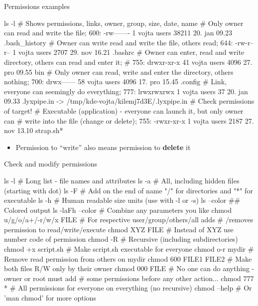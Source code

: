 \documentclass[compress, ucs, xelatex, 11pt, xcolor=svgnames, aspectratio=169,
	hyperref={
		bookmarks=true,
		unicode=true,
		colorlinks=true,
		pdftitle={Linux, command line and MetaCentrum},
		plainpages=false,
		pdfauthor={Vojtech Zeisek},
		pdfsubject={Course about use of Linux command line, writing shell scripts and using MetaCentrum of CESNET},
		pdfcreator={XeLaTeX},
		pdfkeywords={Linux, GNU, BASH, shell, command line, MetaCentrum},
		linkcolor=DarkRed, %
		anchorcolor=DarkBlue, %
		citecolor=Indigo, %
		filecolor=NavyBlue, %
		menucolor=DarkMagenta, %
		urlcolor=DarkBlue, %
		pdftex},
	url={hyphens, lowtilde} %
	]{beamer}
\begin{document}
\begin{frame}[fragile]{Permissions examples}
	\begin{bashcode}
    ls -l # Shows permissions, links, owner, group, size, date, name
    # Only owner can read and write the file; 600:
    -rw-------   1 vojta users   38211 20. jan 09.23 .bash_history
    # Owner can write read and write the file, others read; 644:
    -rw-r--r--   1 vojta users    2707 29. nov 16.21 .bashrc
    # Owner can enter, read and write directory, others can read and enter it;
    # 755:
    drwxr-xr-x  41 vojta users    4096 27. pro 09.55 bin
    # Only owner can read, write and enter the directory, others nothing; 700:
    drwx------  58 vojta users    4096 17. pro 15.45 .config
    # Link, everyone can seemingly do everything; 777:
    lrwxrwxrwx   1 vojta users      37 20. jan 09.33 .lyxpipe.in ->
      /tmp/kde-vojta/kilemj7d3E/.lyxpipe.in # Check permissions of target!
    # Executable (application) - everyone can launch it, but only owner can
    # write into the file (change or delete); 755:
    -rwxr-xr-x   1 vojta users    2187 27. nov 13.10 strap.sh*
	\end{bashcode}
	\vfill
	\begin{itemize}
		\item Permission to \enquote{write} also means permission to \textbf{delete} it
	\end{itemize}
\end{frame}

\begin{frame}[fragile]{Check and modify permissions}
	\begin{bashcode}
    ls -l # Long list - file names and attributes
    ls -a # All, including hidden files (starting with dot)
    ls -F # Add on the end of name "/" for directories and "*" for executable
    ls -h # Human readable size units (use with -l or -s)
    ls --color ## Colored output
    ls -laFh --color # Combine any parameters you like
    chmod u/g/o/a+/-r/w/x FILE # For respective user/group/others/all adds
                               # /removes permission to read/write/execute
    chmod XYZ FILE # Instead of XYZ use number code of permission
    chmod -R # Recursive (including subdirectories)
    chmod +x script.sh # Make script.sh executable for everyone
    chmod o-r mydir # Remove read permission from others on mydir
    chmod 600 FILE1 FILE2 # Make both files R/W only by their owner
    chmod 000 FILE # No one can do anything - owner or root must add
                   # some permissions before any other action...
    chmod 777 * # All permissions for everyone on everything (no recursive)
    chmod --help # Or 'man chmod' for more options
	\end{bashcode}
\end{frame}
\end{document}
